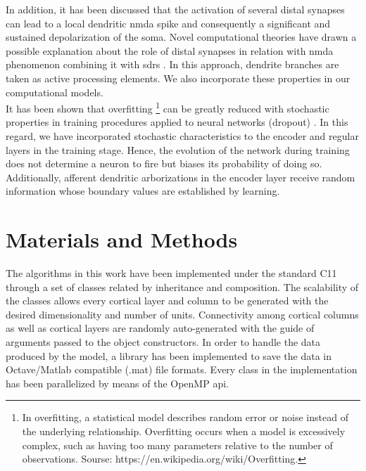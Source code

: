 \documentclass[11pt,a4paper]{article}
\newcommand{\CC}{C\nolinebreak\hspace{-.05em}\raisebox{.4ex}{\tiny\bf +}\nolinebreak\hspace{-.10em}\raisebox{.4ex}{\tiny\bf +}}
\begin{document}
In addition, it has been discussed  %
that the activation of several distal
synapses can lead to a local dendritic \gls{nmda}
spike and consequently a significant
and sustained depolarization of the soma.
Novel computational theories have drawn a possible explanation
about the role of distal synapses in relation with \gls{nmda}
phenomenon \cite{hawkins_2016}
combining it with \glspl{sdr} \cite{ahmad_2016}.
In this approach, dendrite branches are taken as active processing elements.
We also incorporate these properties in our computational models. \\

It has been shown that overfitting
\footnote{In overfitting, a statistical model describes random error or noise instead of the underlying relationship. %
Overfitting occurs when a model is excessively complex, such as having too many parameters relative to the number of observations. %
Sourse: https://en.wikipedia.org/wiki/Overfitting.}
can be greatly reduced with
stochastic properties in training procedures
applied to neural networks (dropout) \cite{JMLR:v15:srivastava14a}.
In this regard, we have incorporated stochastic characteristics to
the encoder and regular layers in the training stage.
Hence, the evolution of the network during training does not
determine a neuron to fire but biases its probability
of doing so. Additionally, afferent dendritic arborizations
in the encoder layer receive random information whose
boundary values are established by learning. \\












\section{Materials and Methods}

The algorithms in this work have been implemented under the standard \CC11 through a set of
classes related by inheritance and composition.
The scalability of the classes allows every cortical layer and column to be generated
with the desired dimensionality and number of units. Connectivity among cortical columns as well as
cortical layers are randomly auto-generated with the guide of arguments passed to the
object constructors. In order to handle the data produced by the model,
a library has been implemented to save the data in Octave/Matlab compatible (.mat) file formats.
Every class in the implementation has been parallelized by means of the OpenMP \gls{api}. \\
\end{document}
